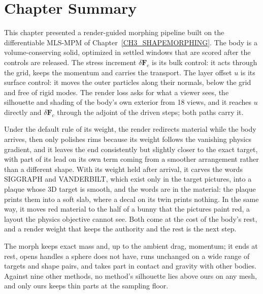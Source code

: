 \section{Chapter Summary}
\label{ch4:sec_summary}

This chapter presented a render-guided morphing pipeline built on the differentiable MLS-MPM of
Chapter~\ref{CH3_SHAPEMORPHING}. The body is a volume-conserving solid, optimized in settled windows that are scored after
the controls are released. The stress increment $\delta\mathbf{F}_c$ is its bulk control: it acts through the grid, keeps
the momentum and carries the transport. The layer offset $u$ is its surface control: it moves the outer particles along
their normals, below the grid and free of rigid modes. The render loss asks for what a viewer sees, the silhouette and
shading of the body's own exterior from 18 views, and it reaches $u$ directly and $\delta\mathbf{F}_c$ through the adjoint
of the driven steps; both paths carry it.

Under the default rule of its weight, the render redirects material while the body arrives, then only polishes rims
because its weight follows the vanishing physics gradient, and it leaves the end consistently but slightly closer to the
exact target, with part of its lead on its own term coming from a smoother arrangement rather than a different shape.
With its weight held after arrival, it carves the words SIGGRAPH and VANDERBILT, which exist only in the target pictures,
into a plaque whose 3D target is smooth, and the words are in the material: the plaque prints them into a soft slab,
where a decal on its twin prints nothing. In the same way, it moves red material to the half of a bunny that the pictures
paint red, a layout the physics objective cannot see. Both come at the cost of the body's rest, and a render weight that
keeps the authority and the rest is the next step.

The morph keeps exact mass and, up to the ambient drag, momentum; it ends at rest, opens handles a sphere does not have,
runs unchanged on a wide range of targets and shape pairs, and takes part in contact and gravity with other bodies.
Against nine other methods, no method's silhouette lies above ours on any mesh, and only ours keeps thin parts at the
sampling floor.

\setlength{\emergencystretch}{1.5em}
